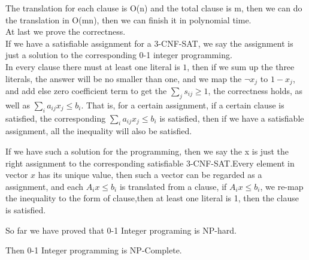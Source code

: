 \documentclass[oneside]{homework} %
\begin{document}
The translation for each clause is O(n) and the total clause is m, then we can do the translation in O(mn), then we can finish it in polynomial time. \\

At last we prove the correctness. \\

If we have a satisfiable assignment for a 3-CNF-SAT, we say the assignment is just a solution to the corresponding 0-1 integer programming. \\ In every clause there must at least one literal is $1$, then if we sum up the three literals, the answer will be no smaller than one, and we map the $\neg x_{j}$ to $1-x_{j}$, and add else zero coefficient term to get the $\sum_{j}s_{ij} \geq 1$, the correctness holds, as well as $\sum_{i}a_{ij}x_{j} \leq b_{i}$. That is, for a certain assignment, if a certain clause is satisfied, the corresponding $\sum_{i}a_{ij}x_{j} \leq b_{i}$ is satisfied, then if we have a satisfiable assignment, all the inequality will also be satisfied.

If we have such a solution for the programming, then we say the x is just the right assignment to the corresponding satisfiable 3-CNF-SAT.Every element in vector $x$ has its unique value, then such a vector can be regarded as a assignment, and each $A_{i}x \leq b_{i}$ is translated from a clause, if $A_{i}x \leq b_{i}$, we re-map the inequality to the form of clause,then at least one literal is 1, then the clause is satisfied.

So far we have proved that 0-1 Integer programing is NP-hard.

Then 0-1 Integer programming is NP-Complete.
\end{document}
